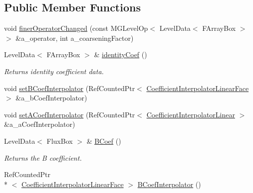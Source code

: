 \subsection*{Public Member Functions}
\begin{DoxyCompactItemize}
\item 
void \hyperlink{class_a_m_r_non_linear_v_c_op_a36b3867478140856f329e3c145c12d98}{finer\-Operator\-Changed} (const M\-G\-Level\-Op$<$ Level\-Data$<$ F\-Array\-Box $>$ $>$ \&a\-\_\-operator, int a\-\_\-coarsening\-Factor)
\item 
\hypertarget{class_a_m_r_non_linear_v_c_op_a8d5ae09f2da749b7a1c916f239369c14}{Level\-Data$<$ F\-Array\-Box $>$ \& \hyperlink{class_a_m_r_non_linear_v_c_op_a8d5ae09f2da749b7a1c916f239369c14}{identity\-Coef} ()}\label{class_a_m_r_non_linear_v_c_op_a8d5ae09f2da749b7a1c916f239369c14}

\begin{DoxyCompactList}\small\item\em Returns identity coefficient data. \end{DoxyCompactList}\item 
void \hyperlink{class_a_m_r_non_linear_v_c_op_aca3691384e09691970d00da4afb566d1}{set\-B\-Coef\-Interpolator} (Ref\-Counted\-Ptr$<$ \hyperlink{class_coefficient_interpolator_linear_face}{Coefficient\-Interpolator\-Linear\-Face} $>$ \&a\-\_\-b\-Coef\-Interpolator)
\item 
void \hyperlink{class_a_m_r_non_linear_v_c_op_a3ccd0ded6d61f3d6e6e82d54c008f698}{set\-A\-Coef\-Interpolator} (Ref\-Counted\-Ptr$<$ \hyperlink{class_coefficient_interpolator_linear}{Coefficient\-Interpolator\-Linear} $>$ \&a\-\_\-a\-Coef\-Interpolator)
\item 
\hypertarget{class_a_m_r_non_linear_v_c_op_a49f6071abe9cdf2d8c3eb56637554c5e}{Level\-Data$<$ Flux\-Box $>$ \& \hyperlink{class_a_m_r_non_linear_v_c_op_a49f6071abe9cdf2d8c3eb56637554c5e}{B\-Coef} ()}\label{class_a_m_r_non_linear_v_c_op_a49f6071abe9cdf2d8c3eb56637554c5e}

\begin{DoxyCompactList}\small\item\em Returns the B coefficient. \end{DoxyCompactList}\item 
\hypertarget{class_a_m_r_non_linear_v_c_op_af4a0c714b466366e249458d2d90a222a}{Ref\-Counted\-Ptr\\*
$<$ \hyperlink{class_coefficient_interpolator_linear_face}{Coefficient\-Interpolator\-Linear\-Face} $>$ \hyperlink{class_a_m_r_non_linear_v_c_op_af4a0c714b466366e249458d2d90a222a}{B\-Coef\-Interpolator} ()}\label{class_a_m_r_non_linear_v_c_op_af4a0c714b466366e249458d2d90a222a}


\end{DoxyCompactItemize}
